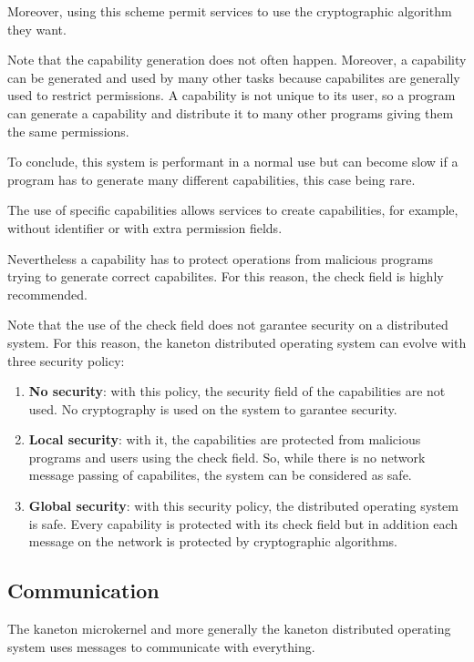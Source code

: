 \documentclass[10pt,a4wide]{article}
\begin{document}
\begin{multicols}{2}
Moreover, using this scheme permit services to use the cryptographic algorithm
they want.

Note that the capability generation does not often happen. Moreover,
a capability can be generated and used by many other tasks because
capabilites are generally used to restrict permissions. A capability
is not unique to its user, so a program can generate a capability and
distribute it to many other programs giving them the same permissions.

To conclude, this system is performant in a normal use but can become
slow if a program has to generate many different capabilities, this case
being rare.

The use of specific capabilities allows services to create capabilities,
for example, without identifier or with extra permission fields.

Nevertheless a capability has to protect operations from malicious programs
trying to generate correct capabilites. For this reason, the check field is
highly recommended.

Note that the use of the check field does not garantee security on a
distributed system. For this reason, the kaneton distributed operating
system can evolve with three security policy:

\begin{enumerate}

\item \textbf{No security}: with this policy, the security field of the
      capabilities are not used. No cryptography is used on the system
      to garantee security.
\item \textbf{Local security}: with it, the capabilities are protected from
      malicious programs and users using the check field. So, while there
      is no network message passing of capabilites, the system can be
      considered as safe.
\item \textbf{Global security}: with this security policy, the distributed
      operating system is safe. Every capability is protected with its check
      field but in addition each message on the network is protected by
      cryptographic algorithms.

\end{enumerate}

\subsection{Communication}

The kaneton microkernel and more generally the kaneton distributed operating
system uses messages to communicate with everything.


\end{multicols}
\end{document}
